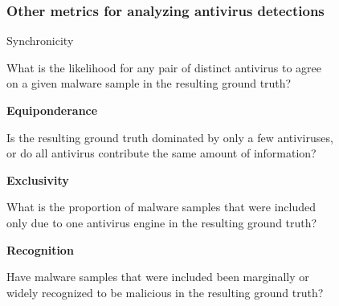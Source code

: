 \begin{frame}
    \frametitle{Other metrics for analyzing antivirus detections}
    \centering

    \begin{block}{}
        \centering
        Synchronicity \\
    \end{block}
    \small{
        What is the likelihood for any pair of distinct antivirus to agree \\
        on a given malware sample in the resulting ground truth?
    }

    \begin{block}{}
        \centering
        \textbf{Equiponderance} \\
    \end{block}
    \small{
        Is the resulting ground truth dominated by only a few antiviruses, \\
        or do all antivirus contribute the same amount of information?
    }

    \begin{block}{}
        \centering
        \textbf{Exclusivity} \\
    \end{block}
    \small{
        What is the proportion of malware samples that were included \\
        only due to one antivirus engine in the resulting ground truth?
    }

    \begin{block}{}
        \centering
        \textbf{Recognition} \\
    \end{block}
    \small{
        Have malware samples that were included been marginally or \\
        widely recognized to be malicious in the resulting ground truth?
    }

\end{frame}

